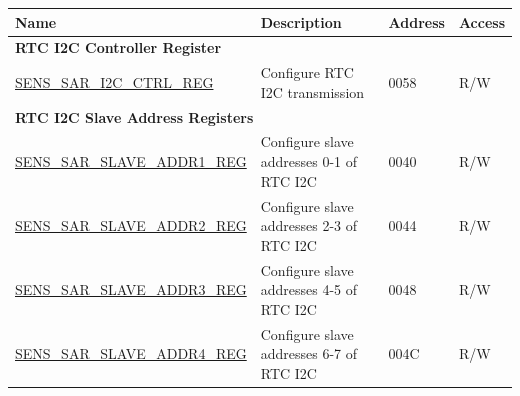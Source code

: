 \begin{longtable}{ | p{6cm} | p{7.2cm} | p{1.3cm} | p{1cm} | }
\hline\rowcolor{lightgray}
Name & Description &  Address & Access \\ \hline
\endhead
\multicolumn{4}{|l|}{\textbf{RTC I2C Controller Register}} \\ \hline
\hyperref[regdesc:SENSSARI2CCTRLREG]{SENS\_SAR\_I2C\_CTRL\_REG} & Configure RTC I2C transmission & \hexprefix{}0058 & R/W \\ \hline
\multicolumn{4}{|l|}{\textbf{RTC I2C Slave Address Registers}} \\ \hline
\hyperref[regdesc:SENSSARSLAVEADDR1REG]{SENS\_SAR\_SLAVE\_ADDR1\_REG} & Configure slave addresses 0-1 of RTC I2C & \hexprefix{}0040 & R/W \\ \hline
\hyperref[regdesc:SENSSARSLAVEADDR2REG]{SENS\_SAR\_SLAVE\_ADDR2\_REG} & Configure slave addresses 2-3 of RTC I2C & \hexprefix{}0044 & R/W \\ \hline
\hyperref[regdesc:SENSSARSLAVEADDR3REG]{SENS\_SAR\_SLAVE\_ADDR3\_REG} & Configure slave addresses 4-5 of RTC I2C & \hexprefix{}0048 & R/W \\ \hline
\hyperref[regdesc:SENSSARSLAVEADDR4REG]{SENS\_SAR\_SLAVE\_ADDR4\_REG} & Configure slave addresses 6-7 of RTC I2C & \hexprefix{}004C & R/W \\ \hline
\end{longtable}

